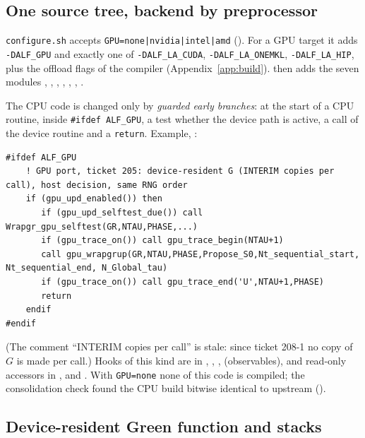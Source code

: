 \subsection{One source tree, backend by preprocessor}

\texttt{configure.sh} accepts \texttt{GPU=none|nvidia|intel|amd} (). For a GPU target it adds \texttt{-DALF\_GPU} and exactly one of \texttt{-DALF\_LA\_CUDA}, \texttt{-DALF\_LA\_ONEMKL}, \texttt{-DALF\_LA\_HIP}, plus the offload flags of the compiler (Appendix~\ref{app:build}).  then adds the seven modules , , , , , , .

The CPU code is changed only by \emph{guarded early branches}: at the start of a CPU routine, inside \texttt{\#ifdef ALF\_GPU}, a test whether the device path is active, a call of the device routine and a \texttt{return}. Example, :
\begin{lstlisting}
#ifdef ALF_GPU
    ! GPU port, ticket 205: device-resident G (INTERIM copies per call), host decision, same RNG order
    if (gpu_upd_enabled()) then
       if (gpu_upd_selftest_due()) call Wrapgr_gpu_selftest(GR,NTAU,PHASE,...)
       if (gpu_trace_on()) call gpu_trace_begin(NTAU+1)
       call gpu_wrapgrup(GR,NTAU,PHASE,Propose_S0,Nt_sequential_start, Nt_sequential_end, N_Global_tau)
       if (gpu_trace_on()) call gpu_trace_end('U',NTAU+1,PHASE)
       return
    endif
#endif
\end{lstlisting}
(The comment ``INTERIM copies per call'' is stale: since ticket 208-1 no copy of $G$ is made per call.) Hooks of this kind are in , , ,  (observables), and read-only accessors in ,  and . With \texttt{GPU=none} none of this code is compiled; the consolidation check found the CPU build bitwise identical to upstream ().


\subsection{Device-resident Green function and stacks}

